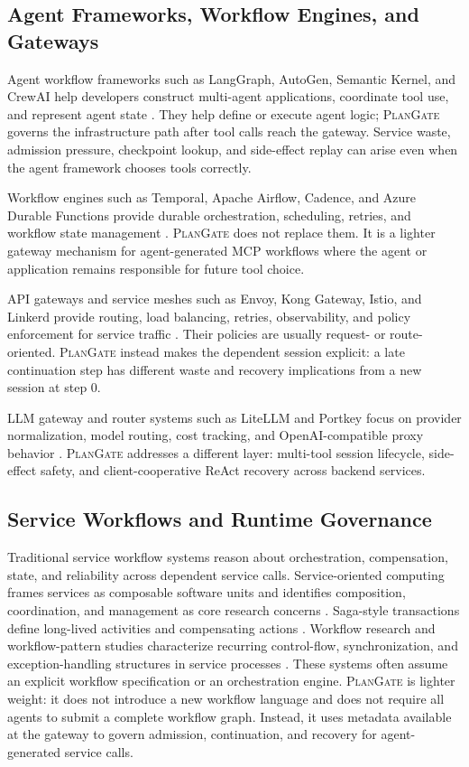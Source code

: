 \documentclass[5p,times]{elsarticle}
\newcommand{\plangate}{\textsc{PlanGate}\xspace}
\begin{document}
\subsection{Agent Frameworks, Workflow Engines, and Gateways}

Agent workflow frameworks such as LangGraph, AutoGen, Semantic Kernel, and CrewAI help developers construct multi-agent applications, coordinate tool use, and represent agent state \citep{langgraphdocs2026,autogendocs2026}. They help define or execute agent logic; \plangate governs the infrastructure path after tool calls reach the gateway. Service waste, admission pressure, checkpoint lookup, and side-effect replay can arise even when the agent framework chooses tools correctly.

Workflow engines such as Temporal, Apache Airflow, Cadence, and Azure Durable Functions provide durable orchestration, scheduling, retries, and workflow state management \citep{temporaldocs2026,airflowdocs2026}. \plangate does not replace them. It is a lighter gateway mechanism for agent-generated MCP workflows where the agent or application remains responsible for future tool choice.

API gateways and service meshes such as Envoy, Kong Gateway, Istio, and Linkerd provide routing, load balancing, retries, observability, and policy enforcement for service traffic \citep{envoydocs2026,istiodocs2026}. Their policies are usually request- or route-oriented. \plangate instead makes the dependent session explicit: a late continuation step has different waste and recovery implications from a new session at step 0.

LLM gateway and router systems such as LiteLLM and Portkey focus on provider normalization, model routing, cost tracking, and OpenAI-compatible proxy behavior \citep{litellmdocs2026}. \plangate addresses a different layer: multi-tool session lifecycle, side-effect safety, and client-cooperative ReAct recovery across backend services.

\subsection{Service Workflows and Runtime Governance}

Traditional service workflow systems reason about orchestration, compensation, state, and reliability across dependent service calls. Service-oriented computing frames services as composable software units and identifies composition, coordination, and management as core research concerns \citep{papazoglou2003soc,papazoglou2008roadmap}. Saga-style transactions define long-lived activities and compensating actions \citep{garciamolina1987sagas}. Workflow research and workflow-pattern studies characterize recurring control-flow, synchronization, and exception-handling structures in service processes \citep{vanderAalst2003workflowpatterns}. These systems often assume an explicit workflow specification or an orchestration engine. \plangate is lighter weight: it does not introduce a new workflow language and does not require all agents to submit a complete workflow graph. Instead, it uses metadata available at the gateway to govern admission, continuation, and recovery for agent-generated service calls.
\end{document}
